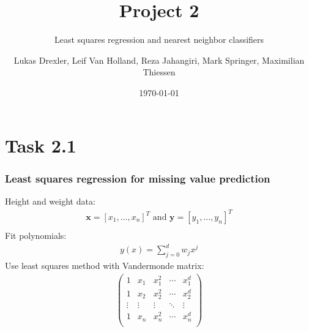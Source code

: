 \documentclass{beamer}
\title[Project 1]{Project 2}
\subtitle{Least squares regression and nearest neighbor classifiers}
\author{Lukas Drexler, Leif Van Holland, Reza Jahangiri, Mark Springer, Maximilian Thiessen}
\institute[Universität Bonn]{Rheinische Friedrich-Wilhelms-Universität}
\date{\today}
\begin{document}
	
\begin{frame}%
	\titlepage
\end{frame}



\section{Task 2.1}

\begin{frame}
\frametitle{Least squares regression for missing value prediction}
Height and weight data:
\begin{align*}
	\mathbf{x} = [x_1,...,x_n]^T \text{ and } \mathbf{y} = [y_1,...,y_n]^T\\
\end{align*}
Fit polynomials:
\begin{align*}
	y(x) = \sum_{j=0}^{d}w_jx^j
\end{align*}
Use least squares method with Vandermonde matrix:
\begin{align*}
\begin{pmatrix}
1 & x_1 & x_1^2 & \cdots & x_1^d \\ 
1 & x_2 & x_2^2 & \cdots & x_2^d \\
\vdots & \vdots & \vdots & \ddots &\vdots \\
1 & x_n & x_n^2 & \cdots & x_n^d \\ 
\end{pmatrix}\\
\end{align*}
\end{frame}
\end{document}
